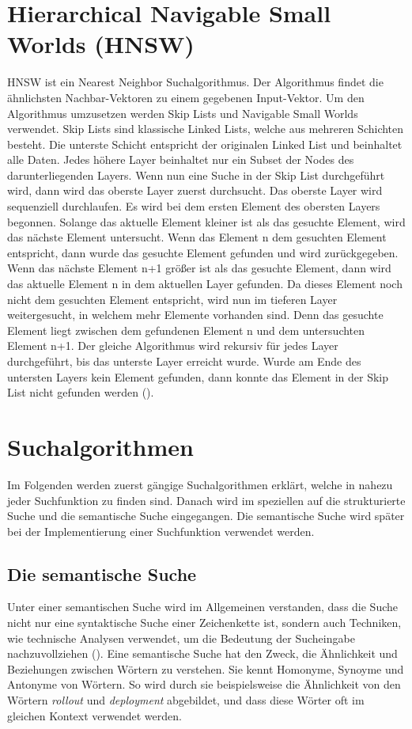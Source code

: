 \section{Hierarchical Navigable Small Worlds (HNSW)}
HNSW ist ein Nearest Neighbor Suchalgorithmus.
Der Algorithmus findet die ähnlichsten Nachbar-Vektoren zu einem gegebenen Input-Vektor.
Um den Algorithmus umzusetzen werden Skip Lists und Navigable Small Worlds verwendet.
Skip Lists sind klassische Linked Lists, welche aus mehreren Schichten besteht.
Die unterste Schicht entspricht der originalen Linked List und beinhaltet alle Daten.
Jedes höhere Layer beinhaltet nur ein Subset der Nodes des darunterliegenden Layers.
Wenn nun eine Suche in der Skip List durchgeführt wird, dann wird das oberste Layer zuerst durchsucht.
Das oberste Layer wird sequenziell durchlaufen.
Es wird bei dem ersten Element des obersten Layers begonnen.
Solange das aktuelle Element kleiner ist als das gesuchte Element, wird das nächste Element untersucht.
Wenn das Element n dem gesuchten Element entspricht, dann wurde das gesuchte Element gefunden und wird zurückgegeben.
Wenn das nächste Element n+1 größer ist als das gesuchte Element, dann wird das aktuelle Element n in dem aktuellen Layer gefunden.
Da dieses Element noch nicht dem gesuchten Element entspricht, wird nun im tieferen Layer weitergesucht, in welchem mehr Elemente vorhanden sind.
Denn das gesuchte Element liegt zwischen dem gefundenen Element n und dem untersuchten Element n+1.
Der gleiche Algorithmus wird rekursiv für jedes Layer durchgeführt, bis das unterste Layer erreicht wurde.
Wurde am Ende des untersten Layers kein Element gefunden, dann konnte das Element in der Skip List nicht gefunden werden (\cite{10.5555/93711}).\\


\section{Suchalgorithmen}
Im Folgenden werden zuerst gängige Suchalgorithmen erklärt, welche in nahezu jeder Suchfunktion zu finden sind.
Danach wird im speziellen auf die strukturierte Suche und die semantische Suche eingegangen.
Die semantische Suche wird später bei der Implementierung einer Suchfunktion verwendet werden.

\subsection{Die semantische Suche}
Unter einer semantischen Suche wird im Allgemeinen verstanden, dass die Suche nicht nur eine syntaktische Suche einer Zeichenkette ist, sondern auch Techniken, wie technische Analysen verwendet, um die Bedeutung der Sucheingabe nachzuvollziehen (\cite{Dengel_2012}).
Eine semantische Suche hat den Zweck, die Ähnlichkeit und Beziehungen zwischen Wörtern zu verstehen.
Sie kennt Homonyme, Synoyme und Antonyme von Wörtern.  
So wird durch sie beispielsweise die Ähnlichkeit von den Wörtern \textit{rollout} und \textit{deployment} abgebildet, und dass diese Wörter oft im gleichen Kontext verwendet werden.\\

